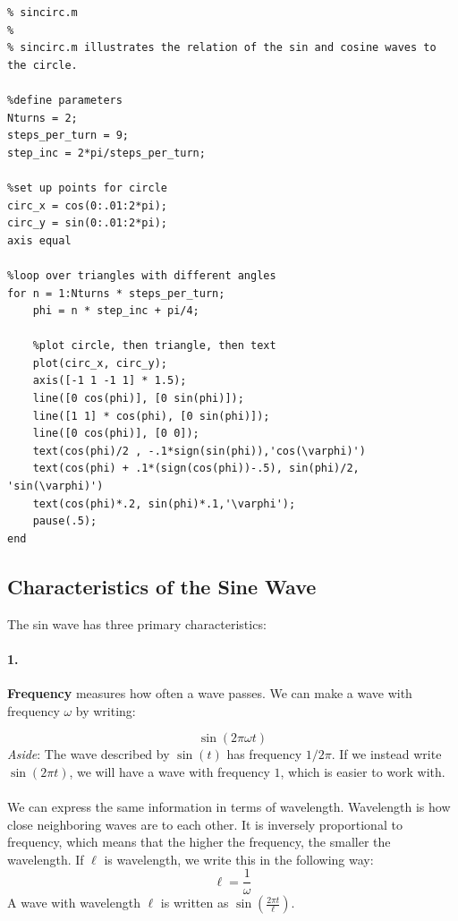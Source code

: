 \documentclass{article}
\begin{document}







\begin{verbatim}
% sincirc.m
%
% sincirc.m illustrates the relation of the sin and cosine waves to the circle.

%define parameters
Nturns = 2;
steps_per_turn = 9;
step_inc = 2*pi/steps_per_turn;

%set up points for circle
circ_x = cos(0:.01:2*pi);
circ_y = sin(0:.01:2*pi);
axis equal

%loop over triangles with different angles
for n = 1:Nturns * steps_per_turn;
    phi = n * step_inc + pi/4;

    %plot circle, then triangle, then text
    plot(circ_x, circ_y);
    axis([-1 1 -1 1] * 1.5);
    line([0 cos(phi)], [0 sin(phi)]);
    line([1 1] * cos(phi), [0 sin(phi)]);
    line([0 cos(phi)], [0 0]);
    text(cos(phi)/2 , -.1*sign(sin(phi)),'cos(\varphi)')
    text(cos(phi) + .1*(sign(cos(phi))-.5), sin(phi)/2, 'sin(\varphi)')
    text(cos(phi)*.2, sin(phi)*.1,'\varphi');
    pause(.5);
end
\end{verbatim}

\subsection{Characteristics of the Sine Wave}
The sin wave has three primary characteristics:
\paragraph*{1.} {\bf Frequency} measures how often a wave passes.  We can make a wave with frequency $\omega$ by writing:

\[\sin\left(2\pi \omega t\right)
\]
{\it Aside}: The wave described by $\sin(t)$ has frequency $1/2\pi$.  If we instead write $\sin(2\pi t)$, we will have a wave with frequency $1$, which is easier to work with.\\ \\
We can express the same information in terms of wavelength.  Wavelength is how close neighboring waves are to each other.  It is inversely proportional to frequency, which means that the higher the frequency, the smaller the wavelength.  If $\ell$ is wavelength, we write this in the following way:
\[\ell = \frac{1}{\omega}
\]
A wave with wavelength $\ell$ is written as $\sin(\frac{2\pi t}{\ell})$.
\end{document}
